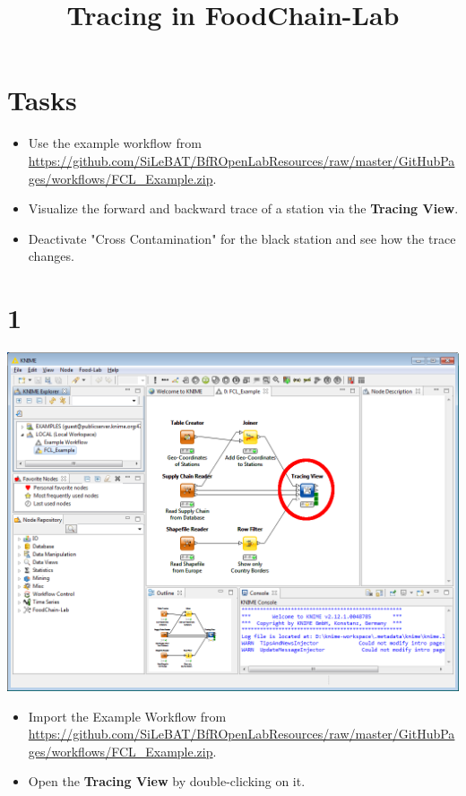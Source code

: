\documentclass{beamer}
\title{Tracing in FoodChain-Lab}
\date{}
\begin{document}
\maketitle

\section{Tasks}
\begin{frame}
	\begin{itemize}
		\item Use the example workflow from \url{https://github.com/SiLeBAT/BfROpenLabResources/raw/master/GitHubPages/workflows/FCL_Example.zip}.
		\item Visualize the forward and backward trace of a station via the \textbf{Tracing View}.
		\item Deactivate "Cross Contamination" for the black station and see how the trace changes.
	\end{itemize}
\end{frame}
 
\section{1}
\begin{frame}
	\begin{center}
  		\includegraphics[height=0.6\textheight]{1.png}
	\end{center}
	\begin{itemize}
		\item Import the Example Workflow from \url{https://github.com/SiLeBAT/BfROpenLabResources/raw/master/GitHubPages/workflows/FCL_Example.zip}.
		\item Open the \textbf{Tracing View} by double-clicking on it.
	\end{itemize}
\end{frame}
\end{document}
